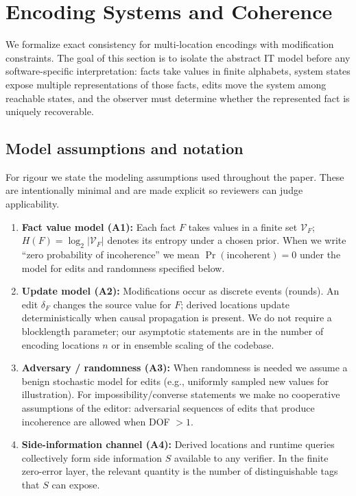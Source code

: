 \section{Encoding Systems and Coherence}\label{sec:foundations}

We formalize exact consistency for multi-location encodings with modification constraints. The goal of this section is to isolate the abstract IT model before any software-specific interpretation: facts take values in finite alphabets, system states expose multiple representations of those facts, edits move the system among reachable states, and the observer must determine whether the represented fact is uniquely recoverable.

\subsection{Model assumptions and notation}\label{sec:assumptions}

For rigour we state the modeling assumptions used throughout the paper. These are intentionally minimal and are made explicit so reviewers can judge applicability.

\begin{enumerate}
\item \textbf{Fact value model (A1):} Each fact $F$ takes values in a finite set $\mathcal{V}_F$; $H(F)=\log_2|\mathcal{V}_F|$ denotes its entropy under a chosen prior. When we write ``zero probability of incoherence'' we mean $\Pr(\text{incoherent})=0$ under the model for edits and randomness specified below.
\item \textbf{Update model (A2):} Modifications occur as discrete events (rounds). An edit $\delta_F$ changes the source value for $F$; derived locations update deterministically when causal propagation is present. We do not require a blocklength parameter; our asymptotic statements are in the number of encoding locations $n$ or in ensemble scaling of the codebase.
\item \textbf{Adversary / randomness (A3):} When randomness is needed we assume a benign stochastic model for edits (e.g., uniformly sampled new values for illustration). For impossibility/converse statements we make no cooperative assumptions of the editor: adversarial sequences of edits that produce incoherence are allowed when DOF $>1$.
\item \textbf{Side-information channel (A4):} Derived locations and runtime queries collectively form side information $S$ available to any verifier. In the finite zero-error layer, the relevant quantity is the number of distinguishable tags that $S$ can expose.
\end{enumerate}

